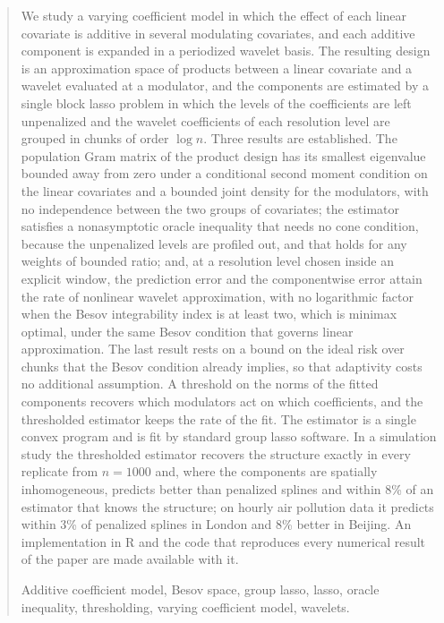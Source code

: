 \begin{quotation}
We study a varying coefficient model in which the effect of each linear
covariate is additive in several modulating covariates, and each additive
component is expanded in a periodized wavelet basis. The resulting design is
an approximation space of products between a linear covariate and a wavelet evaluated at a
modulator, and the components are estimated by a single 
block lasso problem in
which the levels of the coefficients are left unpenalized and the
wavelet coefficients of each resolution level are grouped in chunks of order
$\log n$. Three results are
established. The population Gram matrix of the product design has its
smallest eigenvalue bounded away from zero under a conditional second moment
condition on the linear covariates and a bounded joint density for the
modulators, with no independence between the two groups of covariates; the
estimator satisfies a nonasymptotic oracle inequality that needs no cone
condition, because the unpenalized levels are profiled out, and
that holds for any weights of bounded ratio; and, at a
resolution level chosen inside an explicit window, the prediction error and
the componentwise error attain the rate of nonlinear wavelet approximation, with no logarithmic factor when the Besov
integrability index is at least two, which is minimax optimal, under the same Besov condition that governs
linear approximation. The last result rests on   a
bound on the ideal risk over chunks that the Besov condition already implies,
so that adaptivity costs no additional assumption. A threshold on the
norms of the fitted components recovers which modulators act on which
coefficients, and the thresholded estimator keeps the rate of the fit. The
estimator is a single convex
program and is fit by standard
group lasso software.
In a simulation study the thresholded estimator recovers
the structure exactly in every replicate from $n = 1000$ and, where the
components are spatially inhomogeneous, predicts better than penalized
splines and within 8\% of an estimator that knows the structure; on hourly
air pollution data it predicts within 3\% of penalized splines in London and
8\% better in Beijing.
An implementation in R and the code that reproduces every
numerical result of the paper are made available with it.

\vspace{9pt}
Additive coefficient model, Besov space,  group
lasso, lasso, oracle
inequality, thresholding, varying coefficient model, wavelets.
\par
\end{quotation}\par

\def\thefigure{\arabic{figure}}
\def\thetable{\arabic{table}}

\renewcommand{\theequation}{\thesection.\arabic{equation}}

\fontsize{12}{14pt plus.8pt minus .6pt}\selectfont

